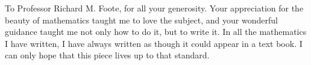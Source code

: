 To Professor Richard M. Foote, for all your generosity.
Your appreciation for the beauty of mathematics taught me to love the subject, and your wonderful guidance taught me not only how to do it, but to write it.
In all the mathematics I have written, I have always written as though it could appear in a text book.
I can only hope that this piece lives up to that standard.
